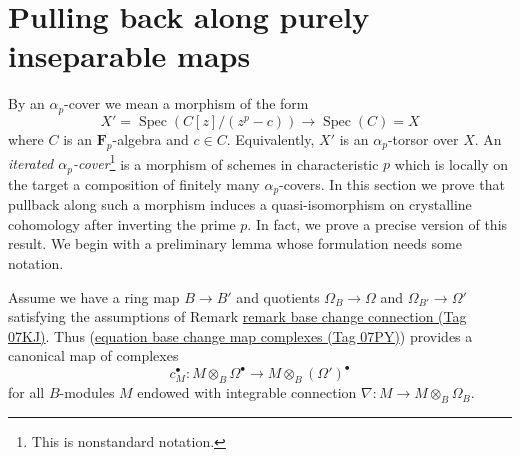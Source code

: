 \documentclass{amsart}
\theoremstyle{plain}
\theoremstyle{definition}
\theoremstyle{remark}
\numberwithin{equation}{subsection}
\def\Spec{\mathop{\mathrm{Spec}}}
\begin{document}
\section{Pulling back along purely inseparable maps}
\label{section-pull-back-along-pth-root}

\noindent
By an $\alpha_p$-cover we mean a morphism of the form
$$
X' = \Spec(C[z]/(z^p - c)) \longrightarrow \Spec(C) = X
$$
where $C$ is an $\mathbf{F}_p$-algebra and $c \in C$. Equivalently,
$X'$ is an $\alpha_p$-torsor over $X$. An {\it iterated
$\alpha_p$-cover}\footnote{This is nonstandard notation.}
is a morphism of schemes in characteristic
$p$ which is locally on the target a composition of finitely many
$\alpha_p$-covers. In this section we prove that pullback along
such a morphism induces a quasi-isomorphism on crystalline cohomology
after inverting the prime $p$. In fact, we prove a precise version
of this result. We begin with a preliminary lemma whose formulation
needs some notation.

\medskip\noindent
Assume we have a ring map $B \to B'$ and quotients $\Omega_B \to \Omega$ and
$\Omega_{B'} \to \Omega'$ satisfying the assumptions of
Remark \href{https://stacks.math.columbia.edu/tag/07KJ}{remark base change connection (Tag 07KJ)}.
Thus (\href{https://stacks.math.columbia.edu/tag/07PY}{equation base change map complexes (Tag 07PY)}) provides a
canonical map of complexes
$$
c_M^\bullet :
M \otimes_B \Omega^\bullet
\longrightarrow
M \otimes_B (\Omega')^\bullet
$$
for all $B$-modules $M$ endowed with integrable connection
$\nabla : M \to M \otimes_B \Omega_B$.
\end{document}
